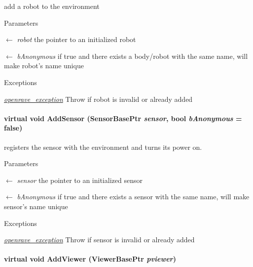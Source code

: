 add a robot to the environment 


\begin{DoxyParams}{Parameters}
\item[\mbox{$\leftarrow$} {\em robot}]the pointer to an initialized robot \item[\mbox{$\leftarrow$} {\em bAnonymous}]if true and there exists a body/robot with the same name, will make robot's name unique \end{DoxyParams}

\begin{DoxyExceptions}{Exceptions}
\item[{\em \hyperlink{classOpenRAVE_1_1openrave__exception}{openrave\_\-exception}}]Throw if robot is invalid or already added \end{DoxyExceptions}
\hypertarget{classOpenRAVE_1_1EnvironmentBase_ad1160d65f608b83f8830010a93ae2991}{
\paragraph[{AddSensor}]{\setlength{\rightskip}{0pt plus 5cm}virtual void AddSensor (SensorBasePtr {\em sensor}, \/  bool {\em bAnonymous} = {\ttfamily false})}\hfill}
\label{classOpenRAVE_1_1EnvironmentBase_ad1160d65f608b83f8830010a93ae2991}


registers the sensor with the environment and turns its power on. 


\begin{DoxyParams}{Parameters}
\item[\mbox{$\leftarrow$} {\em sensor}]the pointer to an initialized sensor \item[\mbox{$\leftarrow$} {\em bAnonymous}]if true and there exists a sensor with the same name, will make sensor's name unique \end{DoxyParams}

\begin{DoxyExceptions}{Exceptions}
\item[{\em \hyperlink{classOpenRAVE_1_1openrave__exception}{openrave\_\-exception}}]Throw if sensor is invalid or already added \end{DoxyExceptions}
\hypertarget{classOpenRAVE_1_1EnvironmentBase_ab1f4975774bc81e490b22698302a61fa}{
\paragraph[{AddViewer}]{\setlength{\rightskip}{0pt plus 5cm}virtual void AddViewer (ViewerBasePtr {\em pviewer})}\hfill}
\label{classOpenRAVE_1_1EnvironmentBase_ab1f4975774bc81e490b22698302a61fa}


